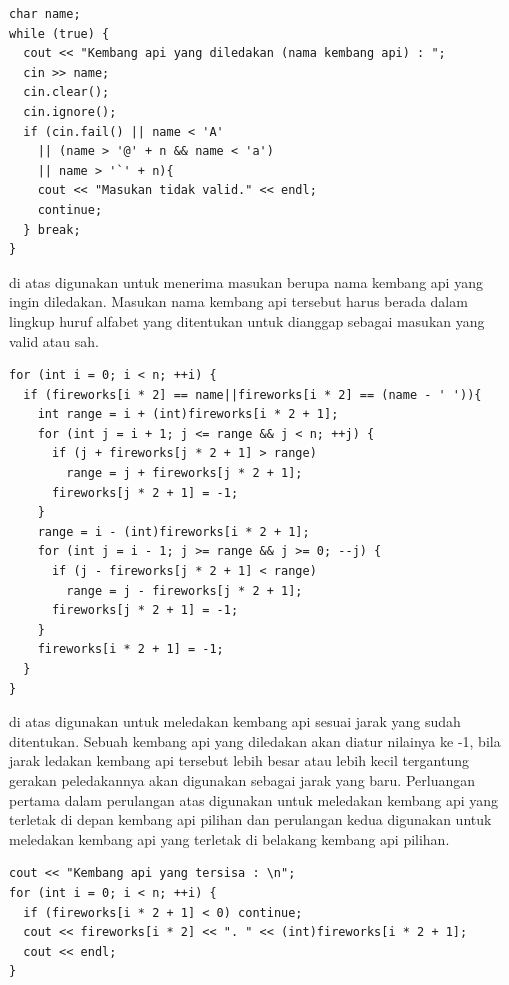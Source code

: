 \documentclass{subfiles}
\begin{document}
\begin{code}
\begin{verbatim}
char name;
while (true) {
  cout << "Kembang api yang diledakan (nama kembang api) : ";
  cin >> name;
  cin.clear();
  cin.ignore();
  if (cin.fail() || name < 'A'
    || (name > '@' + n && name < 'a')
    || name > '`' + n){
    cout << "Masukan tidak valid." << endl;
    continue;
  } break;
}
\end{verbatim}
\end{code}

{\Script} di atas digunakan untuk menerima masukan berupa nama kembang api yang ingin diledakan. Masukan nama kembang api tersebut harus berada dalam lingkup huruf alfabet yang ditentukan untuk dianggap sebagai masukan yang valid atau sah.

\begin{code}
\begin{verbatim}
for (int i = 0; i < n; ++i) {
  if (fireworks[i * 2] == name||fireworks[i * 2] == (name - ' ')){
    int range = i + (int)fireworks[i * 2 + 1];
    for (int j = i + 1; j <= range && j < n; ++j) {
      if (j + fireworks[j * 2 + 1] > range)
        range = j + fireworks[j * 2 + 1];
      fireworks[j * 2 + 1] = -1;
    }
    range = i - (int)fireworks[i * 2 + 1];
    for (int j = i - 1; j >= range && j >= 0; --j) {
      if (j - fireworks[j * 2 + 1] < range)
        range = j - fireworks[j * 2 + 1];
      fireworks[j * 2 + 1] = -1;
    }
    fireworks[i * 2 + 1] = -1;
  }
}
\end{verbatim}
\end{code}

{\Script} di atas digunakan untuk meledakan kembang api sesuai jarak yang sudah ditentukan. Sebuah kembang api yang diledakan akan diatur nilainya ke -1, bila jarak ledakan kembang api tersebut lebih besar atau lebih kecil tergantung gerakan peledakannya akan digunakan sebagai jarak yang baru. Perluangan pertama dalam perulangan atas digunakan untuk meledakan kembang api yang terletak di depan kembang api pilihan dan perulangan kedua digunakan untuk meledakan kembang api yang terletak di belakang kembang api pilihan.

\begin{code}
\begin{verbatim}
cout << "Kembang api yang tersisa : \n";
for (int i = 0; i < n; ++i) {
  if (fireworks[i * 2 + 1] < 0) continue;
  cout << fireworks[i * 2] << ". " << (int)fireworks[i * 2 + 1];
  cout << endl;
}
\end{verbatim}
\end{code}
\end{document}
